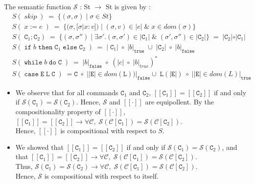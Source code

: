 \documentclass{article}
\newcommand{\E}{\mathtt{E}}
\newcommand{\C}{\mathtt{C}}
\newcommand{\LL}{\mathtt{L}}
\newcommand{\true}{\mathtt{true}}
\newcommand{\false}{\mathtt{false}}
\newcommand{\ifsym}{\mathtt{if}}
\newcommand{\then}{\mathtt{then}}
\newcommand{\elsesym}{\mathtt{else}}
\newcommand{\whilesym}{\mathtt{while}}
\newcommand{\dosym}{\mathtt{do}}
\newcommand{\case}{\mathtt{case}}
\begin{document}
\begin{enumerate}
The semantic function $\mathcal{S}$ : St $\rightarrow$ St is given by :
\begin{align*}
& S( \; skip \; ) \; = \; \{ (\sigma, \sigma) \; | \; \sigma \in St \} \\
& S( \; x := e \; ) \; = \; \{ (\sigma, [\sigma | x : v]) \; | \; (\sigma, v)
\in | e | \; \& \; x \in dom(\sigma) \} \\
& S( \; \C_1 ; \C_2 ) \;  = \; \{ (\sigma, \sigma'') \; | \; \exists
\sigma'.(\sigma, \sigma') \in | \C_1 | \; \&  \; (\sigma',\sigma'') \in | \C_2 | \} 
\; = \; | \C_2 | \circ | \C_1 | \\
& S( \; \ifsym \; b \; \then  \; \C_1 \; \elsesym \; \C_2 \; ) \; = \; | \;
\C_1 | \; \circ  \; | b |_{\true} \; \cup \; |\C_2| \; \circ \; | b |_{\false} \\
& S( \; \whilesym \; b \; \dosym \; \C \; ) \; = \; | b |_{\false} \; \circ \;
(|c| \; \circ \; | b |_{true} )^{*} \\
& S( \; \case \; \E \; \LL \; \C \; ) \; = \C \; \circ \; | |\E| \in
dom(\LL) ) |_{\false} \cup \; \LL(|\E|) \; \circ \; | |\E| \in dom(L) |_{\true} 
\end{align*}

\begin{itemize}
  
\item We observe that for all commands $\C_1$ and $\C_2$, 
$[[\C_1]] = [[\C_2]]$ if and only if $\mathcal{S}(\C_1) = \mathcal{S}(\C_2)$. 
Hence, $\mathcal{S}$ and $[[\cdot]]$ are 
equipollent. By the compositionality property of $[[\cdot]]$,\\

$[[\C_1]] = [[\C_2]] \rightarrow  
 \forall \mathcal{C}, \;	
 \mathcal{S}(\mathcal{C}[\C_1]) = \mathcal{S}(\mathcal{C}[\C_2])$. \\

Hence, $[[\cdot]]$ is compositional with respect to $S$.

\item We showed that $[[\C_1]] = [[\C_2]]$ if and only if $\mathcal{S}(\C_1) =
\mathcal{S}(\C_2)$, and that 
$[[\C_1]] = [[\C_2]] \rightarrow  \forall
\mathcal{C}, \; \mathcal{S}(\mathcal{C}[\C_1]) = \mathcal{S}(\mathcal{C}[\C_2])$. \\

 Thus,  $\mathcal{S}(\C_1) = \mathcal{S}(\C_2) \rightarrow  \forall \mathcal{C},
 \; \mathcal{S}(\mathcal{C}[\C_1]) = \mathcal{S}(\mathcal{C}[\C_2])$. \\
 
 Hence, $\mathcal{S}$ is compositional with respect to itself.


\end{itemize}
\end{enumerate}
\end{document}
